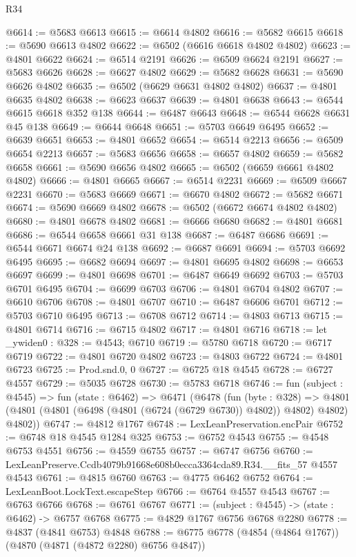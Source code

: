 \begin{lexlean}{R34}
\begin{coremodule}
@6614 := @5683 @6613
@6615 := @6614 @4802
@6616 := @5682 @6615
@6618 := @5690 @6613 @4802
@6622 := @6502 (@6616 @6618 @4802 @4802)
@6623 := @4801 @6622
@6624 := @6514 @2191
@6626 := @6509 @6624 @2191
@6627 := @5683 @6626
@6628 := @6627 @4802
@6629 := @5682 @6628
@6631 := @5690 @6626 @4802
@6635 := @6502 (@6629 @6631 @4802 @4802)
@6637 := @4801 @6635 @4802
@6638 := @6623 @6637
@6639 := @4801 @6638
@6643 := @6544 @6615 @6618 @352 @138
@6644 := @6487 @6643
@6648 := @6544 @6628 @6631 @45 @138
@6649 := @6644 @6648
@6651 := @5703 @6649 @6495
@6652 := @6639 @6651
@6653 := @4801 @6652
@6654 := @6514 @2213
@6656 := @6509 @6654 @2213
@6657 := @5683 @6656
@6658 := @6657 @4802
@6659 := @5682 @6658
@6661 := @5690 @6656 @4802
@6665 := @6502 (@6659 @6661 @4802 @4802)
@6666 := @4801 @6665
@6667 := @6514 @2231
@6669 := @6509 @6667 @2231
@6670 := @5683 @6669
@6671 := @6670 @4802
@6672 := @5682 @6671
@6674 := @5690 @6669 @4802
@6678 := @6502 (@6672 @6674 @4802 @4802)
@6680 := @4801 @6678 @4802
@6681 := @6666 @6680
@6682 := @4801 @6681
@6686 := @6544 @6658 @6661 @31 @138
@6687 := @6487 @6686
@6691 := @6544 @6671 @6674 @24 @138
@6692 := @6687 @6691
@6694 := @5703 @6692 @6495
@6695 := @6682 @6694
@6697 := @4801 @6695 @4802
@6698 := @6653 @6697
@6699 := @4801 @6698
@6701 := @6487 @6649 @6692
@6703 := @5703 @6701 @6495
@6704 := @6699 @6703
@6706 := @4801 @6704 @4802
@6707 := @6610 @6706
@6708 := @4801 @6707
@6710 := @6487 @6606 @6701
@6712 := @5703 @6710 @6495
@6713 := @6708 @6712
@6714 := @4803 @6713
@6715 := @4801 @6714
@6716 := @6715 @4802
@6717 := @4801 @6716
@6718 := let _ywiden0 : @328 := @4543; @6710
@6719 := @5780 @6718
@6720 := @6717 @6719
@6722 := @4801 @6720 @4802
@6723 := @4803 @6722
@6724 := @4801 @6723
@6725 := Prod.snd.{0, 0}
@6727 := @6725 @18 @4545
@6728 := @6727 @4557
@6729 := @5035 @6728
@6730 := @5783 @6718
@6746 := fun (subject : @4545) =>
  fun (state : @6462) =>
  @6471
    (@6478
      (fun (byte : @328) =>
      @4801 (@4801 (@4801 (@6498 (@4801 (@6724 (@6729 @6730)) @4802)) @4802) @4802) @4802))
@6747 := @4812 @1767
@6748 := LexLeanPreservation.encPair
@6752 := @6748 @18 @4545 @1284 @325
@6753 := @6752 @4543
@6755 := @4548 @6753 @4551
@6756 := @4559 @6755
@6757 := @6747 @6756
@6760 := LexLeanPreserve.Ccdb4079b91668e608b0ecca3364cda89.R34.__fits_57 @4557 @4543
@6761 := @4815 @6760
@6763 := @4775 @6462 @6752
@6764 := LexLeanBoot.LockText.escapeStep
@6766 := @6764 @4557 @4543
@6767 := @6763 @6766
@6768 := @6761 @6767
@6771 := (subject : @4545) -> (state : @6462) -> @6757 @6768
@6775 := @4829 @1767 @6756 @6768 @2280
@6778 := @4837 (@4841 @6753) @4848
@6788 := @6775 @6778 (@4854 (@4864 @1767)) (@4870 (@4871 (@4872 @2280) @6756 @4847))

\end{coremodule}
\end{lexlean}
